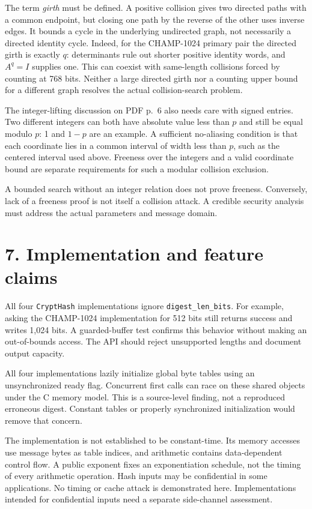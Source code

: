 \documentclass[
  english,
  11pt,
  a4paper,
]{article}
\begin{document}
The term \emph{girth} must be defined. A positive collision gives two
directed paths with a common endpoint, but closing one path by the
reverse of the other uses inverse edges. It bounds a cycle in the
underlying undirected graph, not necessarily a directed identity cycle.
Indeed, for the CHAMP-1024 primary pair the directed girth is exactly
\(q\): determinants rule out shorter positive identity words, and
\(A^q=I\) supplies one. This can coexist with same-length collisions
forced by counting at 768 bits. Neither a large directed girth nor a
counting upper bound for a different graph resolves the actual
collision-search problem.

The integer-lifting discussion on PDF p.~6 also needs care with signed
entries. Two different integers can both have absolute value less than
\(p\) and still be equal modulo \(p\): 1 and \(1-p\) are an example. A
sufficient no-aliasing condition is that each coordinate lies in a
common interval of width less than \(p\), such as the centered interval
used above. Freeness over the integers and a valid coordinate bound are
separate requirements for such a modular collision exclusion.

A bounded search without an integer relation does not prove freeness.
Conversely, lack of a freeness proof is not itself a collision attack. A
credible security analysis must address the actual parameters and
message domain.


\section{7. Implementation and feature
claims}\label{implementation-and-feature-claims}

All four \texttt{CryptHash} implementations ignore
\texttt{digest\_len\_bits}. For example, asking the CHAMP-1024
implementation for 512 bits still returns success and writes 1,024 bits.
A guarded-buffer test confirms this behavior without making an
out-of-bounds access. The API should reject unsupported lengths and
document output capacity.

All four implementations lazily initialize global byte tables using an
unsynchronized ready flag. Concurrent first calls can race on these
shared objects under the C memory model. This is a source-level finding,
not a reproduced erroneous digest. Constant tables or properly
synchronized initialization would remove that concern.

The implementation is not established to be constant-time. Its memory
accesses use message bytes as table indices, and arithmetic contains
data-dependent control flow. A public exponent fixes an exponentiation
schedule, not the timing of every arithmetic operation. Hash inputs may
be confidential in some applications. No timing or cache attack is
demonstrated here. Implementations intended for confidential inputs need
a separate side-channel assessment.
\end{document}
